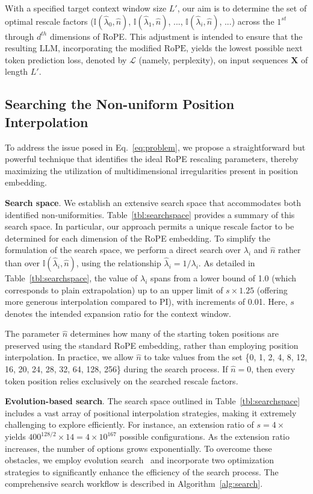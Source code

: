 With a specified target context window size $L'$, our aim is to determine the set of optimal rescale factors ($\mathbb{I}(\hat{\lambda}_{0},\hat{n})$, $\mathbb{I}(\hat{\lambda}_{1},\hat{n})$, ..., $\mathbb{I}(\hat{\lambda}_{i},\hat{n})$, ...) across the $1^{st}$ through $d^{th}$ dimensions of RoPE. This adjustment is intended to ensure that the resulting $\text{LLM}$, incorporating the modified $\text{RoPE}$, yields the lowest possible next token prediction loss, denoted by $\mathcal{L}$ (namely, perplexity), on input sequences $\mathbf{X}$ of length $L'$.

\subsection{Searching the Non-uniform Position Interpolation}

To address the issue posed in Eq.~\ref{eq:problem}, we propose a straightforward but powerful technique that identifies the ideal RoPE rescaling parameters, thereby maximizing the utilization of multidimensional irregularities present in position embedding.

\textbf{Search space}. We establish an extensive search space that accommodates both identified non-uniformities. Table~\ref{tbl:searchspace} provides a summary of this search space. In particular, our approach permits a unique rescale factor to be determined for each dimension of the RoPE embedding. To simplify the formulation of the search space, we perform a direct search over $\lambda_i$ and $\hat{n}$ rather than over $\mathbb{I}(\hat{\lambda}_{i},\hat{n})$, using the relationship $\hat{\lambda}_{i}=1/\lambda_i$. As detailed in Table~\ref{tbl:searchspace}, the value of $\lambda_i$ spans from a lower bound of 1.0 (which corresponds to plain extrapolation) up to an upper limit of $s\times1.25$ (offering more generous interpolation compared to PI), with increments of 0.01. Here, $s$ denotes the intended expansion ratio for the context window.

The parameter $\hat{n}$ determines how many of the starting token positions are preserved using the standard RoPE embedding, rather than employing position interpolation. In practice, we allow $\hat{n}$ to take values from the set \{0, 1, 2, 4, 8, 12, 16, 20, 24, 28, 32, 64, 128, 256\} during the search process. If $\hat{n}=0$, then every token position relies exclusively on the searched rescale factors.

\textbf{Evolution-based search}. The search space outlined in Table~\ref{tbl:searchspace} includes a vast array of positional interpolation strategies, making it extremely challenging to explore efficiently. For instance, an extension ratio of $s=4\times$ yields $400^{128/2}\times14=4\times10^{167}$ possible configurations. As the extension ratio increases, the number of options grows exponentially. To overcome these obstacles, we employ evolution search~\cite{guo2020single} and incorporate two optimization strategies to significantly enhance the efficiency of the search process. The comprehensive search workflow is described in Algorithm~\ref{alg:search}.

